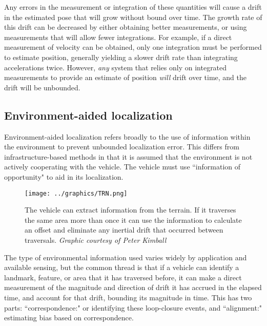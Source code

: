 Any errors in the measurement or integration of these quantities will cause a drift in the estimated pose that will grow without bound over time. The growth rate of this drift can be decreased by either obtaining better measurements, or using measurements that will allow fewer integrations. For example, if a direct measurement of velocity can be obtained, only one integration must be performed to estimate position, generally yielding a slower drift rate than integrating accelerations twice. However, \emph{any} system that relies only on integrated measurements to provide an estimate of position \emph{will} drift over time, and the drift will be unbounded. 

\subsection{Environment-aided localization}

Environment-aided localization refers broadly to the use of information within the environment to prevent unbounded localization error. This differs from infrastructure-based methods in that it is assumed that the environment is not actively cooperating with the vehicle. The vehicle must use ``information of opportunity" to aid in its localization. 

\begin{figure}[!htb]
   \centering
   \texttt{[image: ../graphics/TRN.png]} %
   \caption{The vehicle can extract information from the terrain. If it traverses the same area more than once it can use the information to calculate an offset and eliminate any inertial drift that occurred between traversals. \emph{Graphic courtesy of Peter Kimball}}
   \label{fig:TRN}
\end{figure}

The type of environmental information used varies widely by application and available sensing, but the common thread is that if a vehicle can identify a landmark, feature, or area that it has traversed before, it can make a direct measurement of the magnitude and direction of drift it has accrued in the elapsed time, and account for that drift, bounding its magnitude in time. This has two parts: ``correspondence:" or identifying these loop-closure events, and ``alignment:" estimating bias based on correspondence. 

